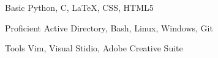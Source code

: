 

\begin{cvhonors}

  \cvhonor
    {Basic} %
    { Python, C, \LaTeX, CSS, HTML5} %

  \cvhonor
    {Proficient} %
    {Active Directory, Bash, Linux, Windows, Git} %

  \cvhonor
    {Tools} %
    {Vim, Visual Stidio, Adobe Creative Suite} %


\end{cvhonors}